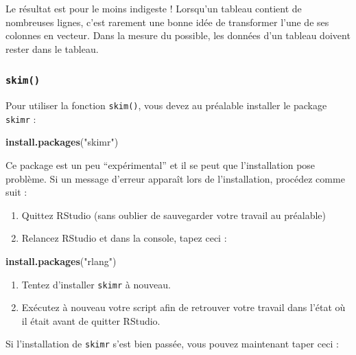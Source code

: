 \documentclass[a4paperpaper,]{article}
\newenvironment{Shaded}{\begin{snugshade}}{\end{snugshade}}
\newcommand{\KeywordTok}[1]{\textcolor[rgb]{0.12,0.11,0.11}{\textbf{#1}}}
\newcommand{\NormalTok}[1]{\textcolor[rgb]{0.12,0.11,0.11}{#1}}
\newcommand{\StringTok}[1]{\textcolor[rgb]{0.75,0.01,0.01}{#1}}
\providecommand{\tightlist}{%
  \setlength{\itemsep}{0pt}\setlength{\parskip}{0pt}}
\begin{document}
Le résultat est pour le moins indigeste ! Lorsqu'un tableau contient de nombreuses lignes, c'est rarement une bonne idée de transformer l'une de ses colonnes en vecteur. Dans la mesure du possible, les données d'un tableau doivent rester dans le tableau.

\hypertarget{skim}{%
\subsubsection{\texorpdfstring{\texttt{skim()}}{skim()}}\label{skim}}

Pour utiliser la fonction \texttt{skim()}, vous devez au préalable installer le package \texttt{skimr} :

\begin{Shaded}
\begin{Highlighting}[]
\KeywordTok{install.packages}\NormalTok{(}\StringTok{"skimr"}\NormalTok{)}
\end{Highlighting}
\end{Shaded}

Ce package est un peu ``expérimental'' et il se peut que l'installation pose problème. Si un message d'erreur apparaît lors de l'installation, procédez comme suit :

\begin{enumerate}
\def\labelenumi{\arabic{enumi}.}
\tightlist
\item
  Quittez RStudio (sans oublier de sauvegarder votre travail au préalable)
\item
  Relancez RStudio et dans la console, tapez ceci :
\end{enumerate}

\begin{Shaded}
\begin{Highlighting}[]
\KeywordTok{install.packages}\NormalTok{(}\StringTok{"rlang"}\NormalTok{)}
\end{Highlighting}
\end{Shaded}

\begin{enumerate}
\def\labelenumi{\arabic{enumi}.}
\setcounter{enumi}{2}
\tightlist
\item
  Tentez d'installer \texttt{skimr} à nouveau.
\item
  Exécutez à nouveau votre script afin de retrouver votre travail dans l'état où il était avant de quitter RStudio.
\end{enumerate}

Si l'installation de \texttt{skimr} s'est bien passée, vous pouvez maintenant taper ceci :
\end{document}
